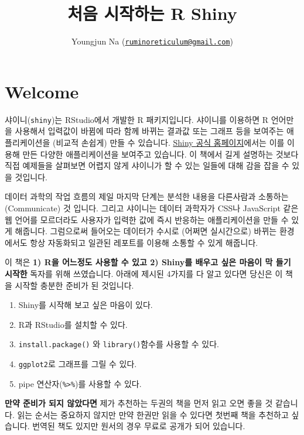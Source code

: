 \documentclass[]{book}
\title{처음 시작하는 R Shiny}
\author{Youngjun Na
(\href{mailto:ruminoreticulum@gmail.com}{\nolinkurl{ruminoreticulum@gmail.com}})}
\date{}
\providecommand{\tightlist}{%
  \setlength{\itemsep}{0pt}\setlength{\parskip}{0pt}}
\begin{document}
\maketitle

{
\setcounter{tocdepth}{1}
\tableofcontents
}
\chapter*{Welcome}\label{welcome}

샤이니(\texttt{shiny})는 RStudio에서 개발한 R 패키지입니다. 샤이니를
이용하면 R 언어만을 사용해서 입력값이 바뀜에 따라 함께 바뀌는 결과값
또는 그래프 등을 보여주는 애플리케이션을 (비교적 손쉽게) 만들 수
있습니다. \href{https://shiny.rstudio.com/gallery/}{Shiny 공식
홈페이지}에서는 이를 이용해 만든 다양한 애플리케이션을 보여주고
있습니다. 이 책에서 길게 설명하는 것보다 직접 예제들을 살펴보면 어렵지
않게 샤이니가 할 수 있는 일들에 대해 감을 잡을 수 있을 것입니다.

데이터 과학의 작업 흐름의 제일 마지막 단계는 분석한 내용을 다른사람과
소통하는(Communicate) 것 입니다. 그리고 샤이니는 데이터 과학자가 CSS나
JavaScript 같은 웹 언어를 모르더라도 사용자가 입력한 값에 즉시 반응하는
애플리케이션을 만들 수 있게 해줍니다. 그럼으로써 들어오는 데이터가
수시로 (어쩌면 실시간으로) 바뀌는 환경에서도 항상 자동화되고 일관된
레포트를 이용해 소통할 수 있게 해줍니다.

이 책은 \textbf{1) R을 어느정도 사용할 수 있고 2) Shiny를 배우고 싶은
마음이 막 들기 시작한} 독자를 위해 쓰였습니다. 아래에 제시된 4가지를 다
알고 있다면 당신은 이 책을 시작할 충분한 준비가 된 것입니다.

\begin{enumerate}
\def\labelenumi{\arabic{enumi}.}
\setcounter{enumi}{-1}
\tightlist
\item
  Shiny를 시작해 보고 싶은 마음이 있다.
\item
  R과 RStudio를 설치할 수 있다.
\item
  \texttt{install.package()} 와 \texttt{library()}함수를 사용할 수 있다.
\item
  \texttt{ggplot2}로 그래프를 그릴 수 있다.
\item
  pipe 연산자(\texttt{\%\textgreater{}\%})를 사용할 수 있다.
\end{enumerate}

\textbf{만약 준비가 되지 않았다면} 제가 추천하는 두권의 책을 먼저 읽고
오면 좋을 것 같습니다. 읽는 순서는 중요하지 않지만 만약 한권만 읽을 수
있다면 첫번째 책을 추천하고 싶습니다. 번역된 책도 있지만 원서의 경우
무료로 공개가 되어 있습니다.
\end{document}
